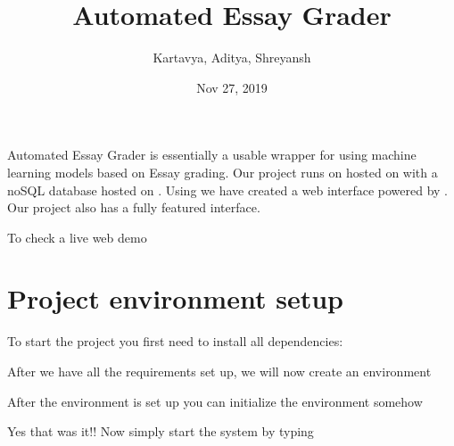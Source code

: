 \documentclass[letterpaper,10pt,english]{sphinxmanual}
\title{Automated Essay Grader}
\date{Nov 27, 2019}
\author{Kartavya, Aditya, Shreyansh}
\begin{document}
\pagestyle{empty}
\sphinxmaketitle
\pagestyle{plain}
\sphinxtableofcontents
\pagestyle{normal}
\label{\detokenize{index::doc}}


Automated Essay Grader is essentially a usable wrapper for using machine learning models based on Essay grading. Our project runs on  hosted on  with a noSQL database hosted on . Using  we have created a web interface powered by . Our project also has a fully featured  interface.

To check a live web demo 


\chapter{Project environment setup}
\label{\detokenize{index:project-environment-setup}}
To start the project you first need to install all dependencies:

\begin{sphinxVerbatim}[commandchars=\\\{\}]
  
\end{sphinxVerbatim}

After we have all the requirements set up, we will now create an environment

\begin{sphinxVerbatim}[commandchars=\\\{\}]
    
\end{sphinxVerbatim}

After the environment is set up you can initialize the environment somehow

\begin{sphinxVerbatim}[commandchars=\\\{\}]
  
\end{sphinxVerbatim}

Yes that was it!! Now simply start the system by typing

\begin{sphinxVerbatim}[commandchars=\\\{\}]
 
\end{sphinxVerbatim}
\end{document}
